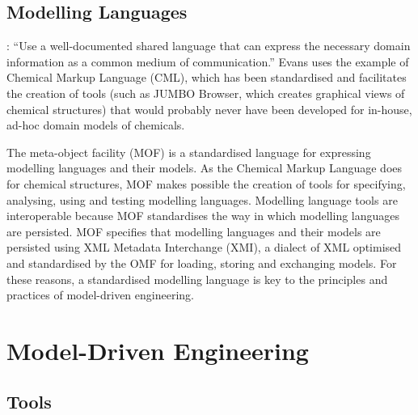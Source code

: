 

\subsection{Modelling Languages}

\cite[pg377]{evans04domain}: ``Use a well-documented shared language that can express the necessary domain information as a common medium of communication.'' Evans uses the example of Chemical Markup Language (CML), which has been standardised and facilitates the creation of tools (such as JUMBO Browser, which creates graphical views of chemical structures) that would probably never have been developed for in-house, ad-hoc domain models of chemicals.



The meta-object facility (MOF) is a standardised language for expressing modelling languages and their models. As the Chemical Markup Language does for chemical structures, MOF makes possible the creation of tools for specifying, analysing, using and testing modelling languages. Modelling language tools are interoperable because MOF standardises the way in which modelling languages are persisted. MOF specifies that modelling languages and their models are persisted using XML Metadata Interchange (XMI), a dialect of XML optimised and standardised by the OMF for loading, storing and exchanging models. For these reasons, a standardised modelling language is key to the principles and practices of model-driven engineering. 


\section{Model-Driven Engineering}

\subsection{Tools}


